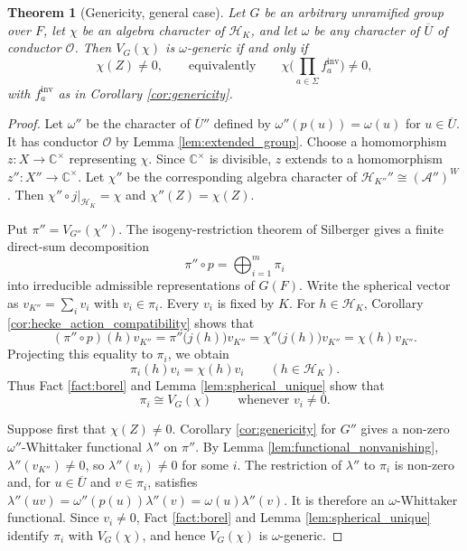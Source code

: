\documentclass[12pt]{article}
\numberwithin{equation}{section}
\newtheorem{theorem}{Theorem}[section]
\theoremstyle{definition}
\theoremstyle{remark}
\theoremstyle{plain}
\begin{document}
\begin{theorem}[Genericity, general case]\label{thm:genericity_general}
Let $G$ be an arbitrary unramified group over $F$, let $\chi$ be an algebra character of $\mathcal{H}_K$, and let $\omega$ be any character of $\overline U$ of conductor $\mathcal O$. Then $V_G(\chi)$ is $\omega$-generic if and only if
$$\chi(Z) \neq 0, \qquad \text{equivalently} \qquad \chi\Big(\prod_{a\in\Sigma}f_a^{\mathrm{inv}}\Big) \neq 0,$$
with $f_a^{\mathrm{inv}}$ as in Corollary \ref{cor:genericity}.
\end{theorem}
\begin{proof}
Let $\omega''$ be the character of $\overline U''$ defined by $\omega''(p(u))=\omega(u)$ for $u\in\overline U$. It has conductor $\mathcal O$ by Lemma \ref{lem:extended_group}. Choose a homomorphism $z:X\to\mathbb C^\times$ representing $\chi$. Since $\mathbb C^\times$ is divisible, $z$ extends to a homomorphism $z'':X''\to\mathbb C^\times$. Let $\chi''$ be the corresponding algebra character of $\mathcal H_{K''}''\cong(\mathcal A'')^W$. Then $\chi''\circ j|_{\mathcal H_K}=\chi$ and $\chi''(Z)=\chi(Z)$.

Put $\pi''=V_{G''}(\chi'')$. The isogeny-restriction theorem of Silberger \cite{Sil79} gives a finite direct-sum decomposition
$$\pi''\circ p=\bigoplus_{i=1}^m\pi_i$$
into irreducible admissible representations of $G(F)$. Write the spherical vector as $v_{K''}=\sum_i v_i$ with $v_i\in\pi_i$. Every $v_i$ is fixed by $K$. For $h\in\mathcal H_K$, Corollary \ref{cor:hecke_action_compatibility} shows that
$$
(\pi''\circ p)(h)v_{K''}
=\pi''\bigl(j(h)\bigr)v_{K''}
=\chi''\bigl(j(h)\bigr)v_{K''}
=\chi(h)v_{K''}.
$$
Projecting this equality to $\pi_i$, we obtain
$$\pi_i(h)v_i=\chi(h)v_i\qquad(h\in\mathcal H_K).$$
Thus Fact \ref{fact:borel} and Lemma \ref{lem:spherical_unique} show that
$$\pi_i\cong V_G(\chi)\qquad\text{whenever }v_i\neq0.$$

Suppose first that $\chi(Z)\neq0$. Corollary \ref{cor:genericity} for $G''$ gives a non-zero $\omega''$-Whittaker functional $\lambda''$ on $\pi''$. By Lemma \ref{lem:functional_nonvanishing}, $\lambda''(v_{K''})\neq0$, so $\lambda''(v_i)\neq0$ for some $i$. The restriction of $\lambda''$ to $\pi_i$ is non-zero and, for $u\in\overline U$ and $v\in\pi_i$, satisfies $\lambda''(uv)=\omega''(p(u))\lambda''(v)=\omega(u)\lambda''(v)$. It is therefore an $\omega$-Whittaker functional. Since $v_i\neq0$, Fact \ref{fact:borel} and Lemma \ref{lem:spherical_unique} identify $\pi_i$ with $V_G(\chi)$, and hence $V_G(\chi)$ is $\omega$-generic.


\end{proof}
\end{document}
